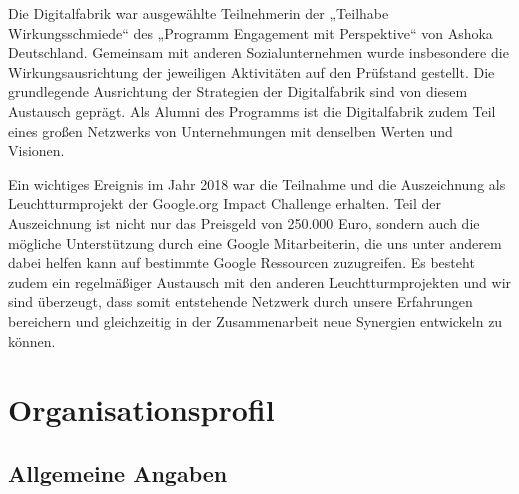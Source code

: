 \documentclass[12pt, a4paper]{article} %
\begin{document}
Die Digitalfabrik war ausgewählte Teilnehmerin der „Teilhabe
Wirkungsschmiede“ des „Programm Engagement mit Perspektive“ von Ashoka
Deutschland. Gemeinsam mit anderen Sozialunternehmen wurde insbesondere
die Wirkungsausrichtung der jeweiligen Aktivitäten auf den Prüfstand
gestellt. Die grundlegende Ausrichtung der Strategien der Digitalfabrik
sind von diesem Austausch geprägt. Als Alumni des Programms ist die
Digitalfabrik zudem Teil eines großen Netzwerks von Unternehmungen mit
denselben Werten und Visionen.

Ein wichtiges Ereignis im Jahr 2018 war die Teilnahme und die
Auszeichnung als Leuchtturmprojekt der Google.org Impact Challenge
erhalten. Teil der Auszeichnung ist nicht nur das Preisgeld von 250.000
Euro, sondern auch die mögliche Unterstützung durch eine Google
Mitarbeiterin, die uns unter anderem dabei helfen kann auf bestimmte
Google Ressourcen zuzugreifen. Es besteht zudem ein regelmäßiger
Austausch mit den anderen Leuchtturmprojekten und wir sind überzeugt,
dass somit entstehende Netzwerk durch unsere Erfahrungen bereichern und
gleichzeitig in der Zusammenarbeit neue Synergien entwickeln zu können.

\hypertarget{organisationsprofil}{%
\section{Organisationsprofil}\label{organisationsprofil}}
\hypertarget{allgemeine-angaben}{%
\subsection{Allgemeine Angaben}\label{allgemeine-angaben}}
\end{document}
